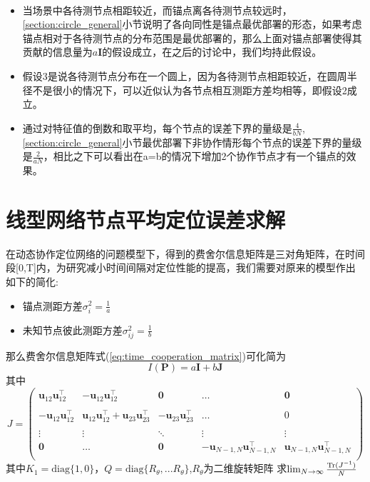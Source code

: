 \begin{remark}
~\\
\begin{itemize}
  \item 当场景中各待测节点相距较近，而锚点离各待测节点较远时，\ref{section:circle_general}小节说明了各向同性是锚点最优部署的形态，如果考虑锚点相对于各待测节点的分布范围是最优部署的，那么上面对锚点部署使得其贡献的信息量为$a\bm{I}$的假设成立，在之后的讨论中，我们均持此假设。
  \item 假设3是说各待测节点分布在一个圆上，因为各待测节点相距较近，在圆周半径不是很小的情况下，可以近似认为各节点相互测距方差均相等，即假设2成立。
  \item 通过对特征值的倒数和取平均，每个节点的误差下界的量级是$\frac{4}{bN}$,\ref{section:circle_general}小节最优部署下非协作情形每个节点的误差下界的量级是$\frac{2}{aN}$，相比之下可以看出在a=b的情况下增加2个协作节点才有一个锚点的效果。
\end{itemize}

\end{remark}
\section{线型网络节点平均定位误差求解}\label{section:linear_network}
在动态协作定位网络的问题模型下，得到的费舍尔信息矩阵是三对角矩阵，在时间段[0,T]内，为研究减小时间间隔对定位性能的提高，我们需要对原来的模型作出如下的简化:
\begin{itemize}
\item 锚点测距方差$\sigma_i^2=\frac{1}{a}$
\item 未知节点彼此测距方差$\sigma^2_{ij}=\frac{1}{b}$
\end{itemize}
那么费舍尔信息矩阵式(\ref{eq:time_cooperation_matrix})可化简为
\begin{equation}\label{eq:Pab}
I(\bm{P})=a\bm{I}+b\bm{J}
\end{equation}
其中\[
J=\left(
\begin{array}{ccccc}
\bm{u}_{12}\bm{u}_{12}^\intercal &-\bm{u}_{12}\bm{u}_{12}^\intercal &\bm{0}&\dots&\bm{0}\\
&&&&\\
-\bm{u}_{12}\bm{u}_{12}^\intercal &\bm{u}_{12}\bm{u}_{12}^\intercal +\bm{u}_{23}\bm{u}_{23}^\intercal &-\bm{u}_{23}\bm{u}_{23}^\intercal &\dots&0\\
&&&&\\
\vdots &\vdots&\ddots &\vdots&\vdots\\
\bm{0}&\dots&\bm{0}&-\bm{u}_{N-1,N}\bm{u}_{N-1,N}^\intercal &\bm{u}_{N-1,N}\bm{u}_{N-1,N}^\intercal \\
\end{array}
\right)
\]
其中$K_1=\text{diag}\{1,0\}$，$Q=\text{diag}\{R_{\theta},...R_{\theta}\}$,$R_{\theta}$为二维旋转矩阵
求$\lim_{N\to \infty}\frac{\operatorname{Tr}(J^{-1})}{N}$


